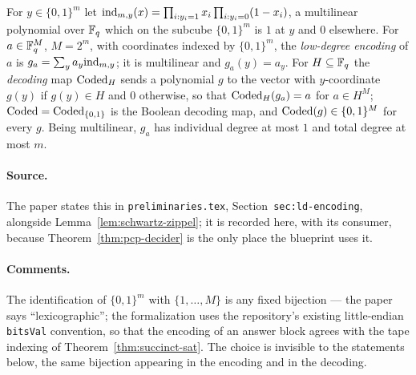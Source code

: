 \effortMathlib

\begin{definition}
\label{def:ld-encoding}
\leanok
For $y \in \{0,1\}^m$ let $\mathrm{ind}_{m,y}(x) = \prod_{i : y_i = 1} x_i \prod_{i : y_i = 0}
(1 - x_i)$, a multilinear polynomial over $\mathbb{F}_q$ which on the subcube $\{0,1\}^m$ is $1$ at
$y$ and $0$ elsewhere. For $a \in \mathbb{F}_q^M$, $M = 2^m$, with coordinates indexed by
$\{0,1\}^m$, the \emph{low-degree encoding} of $a$ is $g_a = \sum_y a_y \mathrm{ind}_{m,y}$; it is
multilinear and $g_a(y) = a_y$. For $H \subseteq \mathbb{F}_q$ the \emph{decoding} map $\mathrm{Coded}_H$
sends a polynomial $g$ to the vector with $y$-coordinate $g(y)$ if $g(y) \in H$ and $0$
otherwise, so that $\mathrm{Coded}_H(g_a) = a$ for $a \in H^M$; $\mathrm{Coded} = \mathrm{Coded}_{\{0,1\}}$ is the
Boolean decoding map, and $\mathrm{Coded}(g) \in \{0,1\}^M$ for every $g$. Being multilinear, $g_a$ has
individual degree at most $1$ and total degree at most $m$.
\end{definition}

\paragraph{Source.} The paper states this in \texttt{preliminaries.tex},
Section~\texttt{sec:ld-encoding}, alongside Lemma~\ref{lem:schwartz-zippel}; it is recorded
here, with its consumer, because Theorem~\ref{thm:pcp-decider} is the only place the blueprint
uses it.

\paragraph{Comments.} The identification of $\{0,1\}^m$ with $\{1, \ldots, M\}$ is any fixed
bijection --- the paper says ``lexicographic''; the formalization uses the repository's
existing little-endian \texttt{bitsVal} convention, so that the encoding of an answer block
agrees with the tape indexing of Theorem~\ref{thm:succinct-sat}. The choice is invisible to
the statements below, the same bijection appearing in the encoding and in the decoding.

